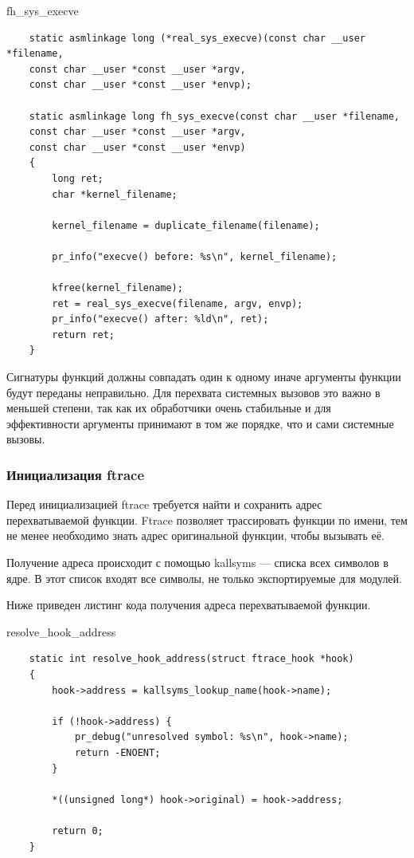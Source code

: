 \documentclass[a4paper,14pt]{extarticle}
\begin{document}
\begin{listing}[h!]
	\caption{fh\_sys\_execve}
	\begin{verbatim}
	static asmlinkage long (*real_sys_execve)(const char __user *filename,
	const char __user *const __user *argv,
	const char __user *const __user *envp);
	
	static asmlinkage long fh_sys_execve(const char __user *filename,
	const char __user *const __user *argv,
	const char __user *const __user *envp)
	{
		long ret;
		char *kernel_filename;
		
		kernel_filename = duplicate_filename(filename);
		
		pr_info("execve() before: %s\n", kernel_filename);
	
		kfree(kernel_filename);
		ret = real_sys_execve(filename, argv, envp);
		pr_info("execve() after: %ld\n", ret);
		return ret;
	}
	\end{verbatim}
\end{listing}

Сигнатуры функций должны совпадать один к одному иначе аргументы функции будут переданы неправильно. Для перехвата системных вызовов это важно в меньшей степени, так как их обработчики очень стабильные и для эффективности аргументы принимают в том же порядке, что и сами системные вызовы.

\subsubsection{Инициализация ftrace}
Перед инициализацией ftrace требуется найти и сохранить адрес перехватываемой функции. Ftrace позволяет трассировать функции по имени, тем не менее необходимо знать адрес оригинальной функции, чтобы вызывать её.

Получение адреса происходит с помощью kallsyms — списка всех символов в ядре. В этот список входят все символы, не только экспортируемые для модулей.

Ниже приведен листинг кода получения адреса перехватываемой функции.

\begin{listing}[h]
	\caption{resolve\_hook\_address}
	\begin{verbatim}
	static int resolve_hook_address(struct ftrace_hook *hook)
	{
		hook->address = kallsyms_lookup_name(hook->name);
		
		if (!hook->address) {
			pr_debug("unresolved symbol: %s\n", hook->name);
			return -ENOENT;
		}
		
		*((unsigned long*) hook->original) = hook->address;
		
		return 0;
	}
	\end{verbatim}
\end{listing}
\end{document}
